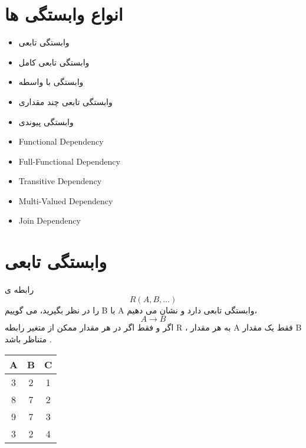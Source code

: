 \documentclass{article}
\begin{document}
\section{انواع وابستگی ها}

\begin{itemize}
	\item وابستگی تابعی
	\item وابستگی تابعی کامل
	\item وابستگی با واسطه
	\item وابستگی تابعی چند مقداری
	\item وابستگی پیوندی
\end{itemize}


\begin{latin}
	\begin{LTR}
		\begin{itemize}
			\item Functional Dependency
			\item Full-Functional Dependency
			\item Transitive Dependency
			\item Multi-Valued Dependency
			\item Join Dependency
		\end{itemize}
	\end{LTR}
\end{latin}




\section{وابستگی تابعی}

رابطه ی 
$$R(A,B,\dots)$$
را در نظر بگیرید، می گوییم B با A وابستگی تابعی دارد و نشان می دهیم، 
$$A \to B$$
اگر و فقط اگر در هر مقدار ممکن از متغیر رابطه R ، به هر مقدار A فقط یک مقدار B متناظر باشد .



\begin{latin}
\begin{center}
  \bgroup
  \def\arraystretch{1.5}%
  \begin{tabular}{  c | c | c }
    A & B & C \\
    \hline
    3 & 2 & 1 \\ 
    8 & 7 & 2 \\ 
    9 & 7 & 3 \\ 
    3 & 2 & 4 \\
  \end{tabular}
  \egroup
\end{center}
\end{latin}
\end{document}
